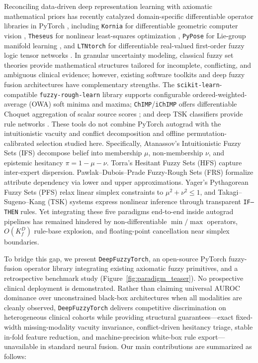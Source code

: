 \documentclass[10pt,twocolumn]{article}
\begin{document}
Reconciling data-driven deep representation learning with axiomatic mathematical priors has
recently catalyzed domain-specific differentiable operator libraries in PyTorch
\cite{paszke2019pytorch}, including \texttt{Kornia} for differentiable geometric computer
vision \cite{riba2020kornia}, \texttt{Theseus} for nonlinear least-squares optimization
\cite{pineda2022theseus}, \texttt{PyPose} for Lie-group manifold learning
\cite{wang2023pypose}, and \texttt{LTNtorch} for differentiable real-valued first-order
fuzzy logic tensor networks \cite{badreddine2022ltntorch}. In granular uncertainty modeling,
classical fuzzy set theories \cite{zadeh1965fuzzy} provide mathematical structures tailored for
incomplete, conflicting, and ambiguous clinical evidence; however, existing software toolkits
and deep fuzzy fusion architectures have complementary strengths. The
\texttt{scikit-learn}-compatible \texttt{fuzzy-rough-learn} library
\cite{lenz2022fuzzyroughlearn} supports configurable ordered-weighted-average (OWA) soft
minima and maxima; \texttt{ChIMP}/\texttt{iChIMP} offers differentiable Choquet aggregation
of scalar source scores \cite{islam2020chimp}; and deep TSK classifiers provide rule networks
\cite{wu2020optimize,cui2021curse}. These tools do not combine PyTorch autograd with the
intuitionistic vacuity and conflict decomposition and offline permutation-calibrated selection
studied here. Specifically, Atanassov's
Intuitionistic Fuzzy Sets (IFS)
\cite{atanassov1986intuitionistic,xu2007intuitionistic} decompose belief into membership $\mu$,
non-membership $\nu$, and epistemic hesitancy $\pi = 1 - \mu - \nu$. Torra's Hesitant Fuzzy
Sets (HFS) \cite{torra2010hesitant,xia2011hesitant,xia2012entropy,liao2013vikor} capture
inter-expert dispersion. Pawlak--Dubois--Prade Fuzzy-Rough Sets (FRS)
\cite{pawlak1982rough,dubois1990rough,jensen2004fuzzy} formalize attribute dependency via lower
and upper approximations. Yager's Pythagorean Fuzzy Sets (PFS) \cite{yager2014pythagorean}
relax linear simplex constraints to $\mu^2 + \nu^2 \le 1$, and Takagi--Sugeno--Kang (TSK)
systems \cite{takagi1985fuzzy,jang1993anfis,wu2020optimize,cui2021curse} express nonlinear
inference through transparent \texttt{IF--THEN} rules. Yet integrating these five paradigms
end-to-end inside autograd pipelines has remained hindered by non-differentiable $\min/\max$
operators, $O(K_f^D)$ rule-base explosion, and floating-point cancellation near simplex
boundaries.

To bridge this gap, we present \texttt{DeepFuzzyTorch}, an open-source PyTorch fuzzy-fusion
operator library integrating existing axiomatic fuzzy primitives, and a retrospective
benchmark study (Figure~\ref{fig:paradigm_teaser}). No prospective clinical deployment is
demonstrated.
Rather than claiming universal AUROC dominance over unconstrained black-box architectures when
all modalities are cleanly observed, \texttt{DeepFuzzyTorch} delivers competitive
discrimination on heterogeneous clinical cohorts while providing structural guarantees---exact
fixed-width
missing-modality vacuity invariance, conflict-driven hesitancy triage, stable in-fold feature
reduction, and machine-precision white-box rule export---unavailable in standard neural fusion.
Our main contributions are summarized as follows:
\end{document}

